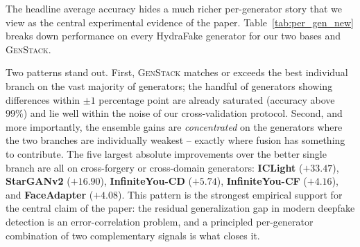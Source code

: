 \documentclass[10pt,twocolumn,letterpaper]{article}
\begin{document}
The headline average accuracy hides a much richer per-generator story that we view as the central experimental evidence of the paper.
Table~\ref{tab:per_gen_new} breaks down performance on every HydraFake generator for our two bases and \textsc{GenStack}.

Two patterns stand out. First, \textsc{GenStack} matches or exceeds the best individual branch on the vast majority of generators; the handful of generators showing differences within $\pm 1$ percentage point are already saturated (accuracy above $99\%$) and lie well within the noise of our cross-validation protocol. Second, and more importantly, the ensemble gains are \emph{concentrated} on the generators where the two branches are individually weakest -- exactly where fusion has something to contribute. The five largest absolute improvements over the better single branch are all on cross-forgery or cross-domain generators: \textbf{ICLight} ($+33.47$), \textbf{StarGANv2} ($+16.90$), \textbf{InfiniteYou-CD} ($+5.74$), \textbf{InfiniteYou-CF} ($+4.16$), and \textbf{FaceAdapter} ($+4.08$). This pattern is the strongest empirical support for the central claim of the paper: the residual generalization gap in modern deepfake detection is an error-correlation problem, and a principled per-generator combination of two complementary signals is what closes it.
\end{document}
